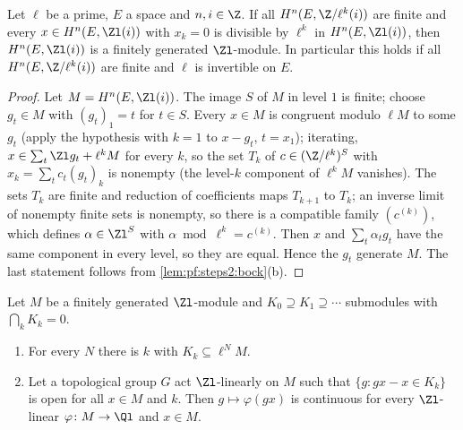\begin{lemma}\label{lem:pf:steps2:adicfin}
Let $\ell$ be a prime, $E$ a space and $n,i\in\Z$. If all $H^n(E,\Z/\ell^k(i))$ are finite and every
$x\in H^n(E,\Zl(i))$ with $x_k=0$ is divisible by $\ell^k$ in $H^n(E,\Zl(i))$, then $H^n(E,\Zl(i))$ is
a finitely generated $\Zl$-module. In particular this holds if all $H^n(E,\Z/\ell^k(i))$ are finite
and $\ell$ is invertible on $E$.
\end{lemma}

\begin{proof}
Let $M=H^n(E,\Zl(i))$. The image $S$ of $M$ in level $1$ is finite; choose $g_t\in M$ with
$(g_t)_1=t$ for $t\in S$. Every $x\in M$ is congruent modulo $\ell M$ to some $g_t$ (apply the
hypothesis with $k=1$ to $x-g_t$, $t=x_1$); iterating, $x\in\sum_t\Zl g_t+\ell^kM$ for every $k$, so the
set $T_k$ of $c\in(\Z/\ell^k)^S$ with $x_k=\sum_tc_t(g_t)_k$ is nonempty (the level-$k$ component of
$\ell^kM$ vanishes). The sets $T_k$ are finite and reduction of coefficients maps $T_{k+1}$ to $T_k$;
an inverse limit of nonempty finite sets is nonempty, so there is a compatible family $(c^{(k)})$, which
defines $\alpha\in\Zl^S$ with $\alpha\bmod\ell^k=c^{(k)}$. Then $x$ and $\sum_t\alpha_tg_t$ have the
same component in every level, so they are equal. Hence the $g_t$ generate $M$. The last statement
follows from \cref{lem:pf:steps2:bock}(b).
\end{proof}

\begin{lemma}[Continuity]\label{lem:pf:steps2:abscont}
Let $M$ be a finitely generated $\Zl$-module and $K_0\supseteq K_1\supseteq\cdots$ submodules with
$\bigcap_kK_k=0$.
\begin{enumerate}[label=\textup{(\alph*)},nosep]
\item For every $N$ there is $k$ with $K_k\subseteq\ell^NM$.
\item Let a topological group $G$ act $\Zl$-linearly on $M$ such that $\{g:gx-x\in K_k\}$ is open for
  all $x\in M$ and $k$. Then $g\mapsto\varphi(gx)$ is continuous for every $\Zl$-linear
  $\varphi\colon M\to\Ql$ and $x\in M$.
\end{enumerate}
\end{lemma}

